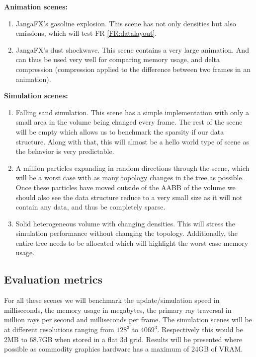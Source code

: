 \noindent\textbf{Animation scenes:}
\begin{enumerate}[noitemsep,topsep=0pt,parsep=0pt,partopsep=0pt]
    \item JangaFX's gasoline explosion. This scene has not only densities but also emissions, which will test FR \ref{FR:datalayout}.
    \item JangaFX's dust shockwave. This scene contains a very large animation. And can thus be used very well for comparing memory usage, and delta compression (compression applied to the difference between two frames in an animation).
\end{enumerate}

\noindent\textbf{Simulation scenes:}
\begin{enumerate}[noitemsep,topsep=0pt,parsep=0pt,partopsep=0pt]
    \item Falling sand simulation. This scene has a simple implementation with only a small area in the volume being changed every frame. The rest of the scene will be empty which allows us to benchmark the sparsity if our data structure. Along with that, this will almost be a hello world type of scene as the behavior is very predictable.
    \item A million particles expanding in random directions through the scene, which will be a worst case with as many topology changes in the tree as possible. Once these particles have moved outside of the AABB of the volume we should also see the data structure reduce to a very small size as it will not contain any data, and thus be completely sparse.
    \item Solid heterogeneous volume with changing densities. This will stress the simulation performance without changing the topology. Additionally, the entire tree needs to be allocated which will highlight the worst case memory usage.
\end{enumerate}

\subsection{Evaluation metrics}\label{EVALUATION:metrics}
For all these scenes we will benchmark the update/simulation speed in milliseconds, the memory usage in megabytes, the primary ray traversal in million rays per second and milliseconds per frame. The simulation scenes will be at different resolutions ranging from $128^3$ to $4069^3$. Respectively this would be 2MB to 68.7GB when stored in a flat 3d grid. Results will be presented where possible as commodity graphics hardware has a maximum of 24GB of VRAM.
